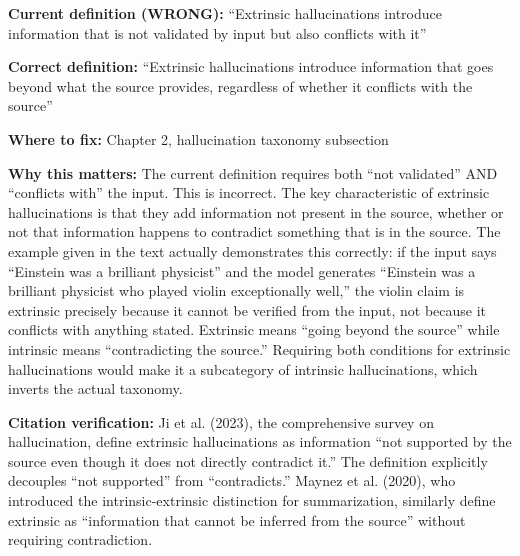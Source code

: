 \documentclass[11pt,a4paper]{article}
\newcommand{\criticalbox}[2]{%
\begin{tcolorbox}[enhanced,breakable,
  colback=LightCrimson,colframe=Crimson,boxrule=1.5pt,arc=4pt,
  left=8pt,right=8pt,top=6pt,bottom=6pt,
  title={\bfseries\small\color{white}#1},
  attach boxed title to top left={yshift=-2mm,xshift=6mm},
  boxed title style={colback=Crimson,arc=3pt,boxrule=0pt,
    left=4pt,right=4pt,top=2pt,bottom=2pt}]
#2
\end{tcolorbox}}
\begin{document}
\criticalbox{CORRECTION 3: Extrinsic Hallucination Definition}{
\textbf{Current definition (WRONG):} ``Extrinsic hallucinations introduce information that is not validated by input but also conflicts with it''

\textbf{Correct definition:} ``Extrinsic hallucinations introduce information that goes beyond what the source provides, regardless of whether it conflicts with the source''

\textbf{Where to fix:} Chapter 2, hallucination taxonomy subsection

\textbf{Why this matters:} The current definition requires both ``not validated'' AND ``conflicts with'' the input. This is incorrect. The key characteristic of extrinsic hallucinations is that they add information not present in the source, whether or not that information happens to contradict something that is in the source. The example given in the text actually demonstrates this correctly: if the input says ``Einstein was a brilliant physicist'' and the model generates ``Einstein was a brilliant physicist who played violin exceptionally well,'' the violin claim is extrinsic precisely because it cannot be verified from the input, not because it conflicts with anything stated. Extrinsic means ``going beyond the source'' while intrinsic means ``contradicting the source.'' Requiring both conditions for extrinsic hallucinations would make it a subcategory of intrinsic hallucinations, which inverts the actual taxonomy.

\textbf{Citation verification:} Ji et al. (2023), the comprehensive survey on hallucination, define extrinsic hallucinations as information ``not supported by the source even though it does not directly contradict it.'' The definition explicitly decouples ``not supported'' from ``contradicts.'' Maynez et al. (2020), who introduced the intrinsic-extrinsic distinction for summarization, similarly define extrinsic as ``information that cannot be inferred from the source'' without requiring contradiction.
}
\end{document}
